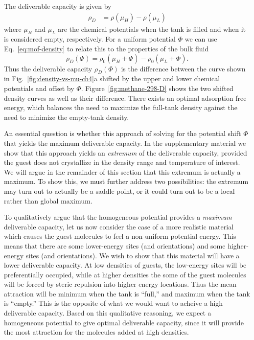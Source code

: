 \documentclass{nature}
\newcommand\V{\Phi}
\begin{document}
The deliverable capacity is given by
\begin{align}
    \rho_D &= \rho(\mu_H) - \rho(\mu_L)
\end{align}
where $\mu_H$ and $\mu_L$ are the chemical potentials when the tank is filled and when it is considered empty, respectively.  For a uniform potential $\V$ we can use Eq.~\ref{eq:mof-density} to relate this to the properties of the bulk fluid
\begin{equation}
    \rho_D(\V) = \rho_0(\mu_H+\V) - \rho_0(\mu_L+\V).
    \label{eq:DofPhi}
\end{equation}
Thus the deliverable capacity $\rho_D(\V)$ is the difference between the curve shown in Fig.~\ref{fig:density-vs-mu-ch4}a shifted by the upper and lower chemical potentials and offset by $\V$.  Figure~\ref{fig:methane-298-D} shows the two shifted density curves as well as their difference.  There exists an optimal adsorption free energy, which balances the need to maximize the full-tank density against the need to minimize the empty-tank density.
%

An essential question is whether this approach of solving for the potential shift $\V$ that yields the maximum deliverable capacity.  In the supplementary material we show that this approach yields an \emph{extremum} of the deliverable capacity, provided the guest does not crystallize in the density range and temperature of interest.  We will argue in the remainder of this section that this extremum is actually a maximum.  To show this, we must further address two possibilities:  the extremum may turn out to actually be a saddle point, or it could turn out to be a local rather than global maximum.


To qualitatively argue that the homogeneous potential provides a \emph{maximum} deliverable capacity, let us now consider the case of a more realistic material which causes the guest molecules to feel a non-uniform potential energy.  This means that there are some lower-energy sites (and orientations) and some higher-energy sites (and orientations).  We wish to show that this material will have a lower deliverable capacity.  At low densities of guests, the low-energy sites will be preferentially occupied, while at higher densities the some of the guest molecules will be forced by steric repulsion into higher energy locations.  Thus the mean attraction will be minimum when the tank is ``full,'' and maximum when the tank is ``empty.''  This is the opposite of what we would want to acheive a high deliverable capacity.  Based on this qualitative reasoning, we expect a homogeneous potential to give optimal deliverable capacity, since it will provide the most attraction for the molecules added at high densities.
\end{document}
